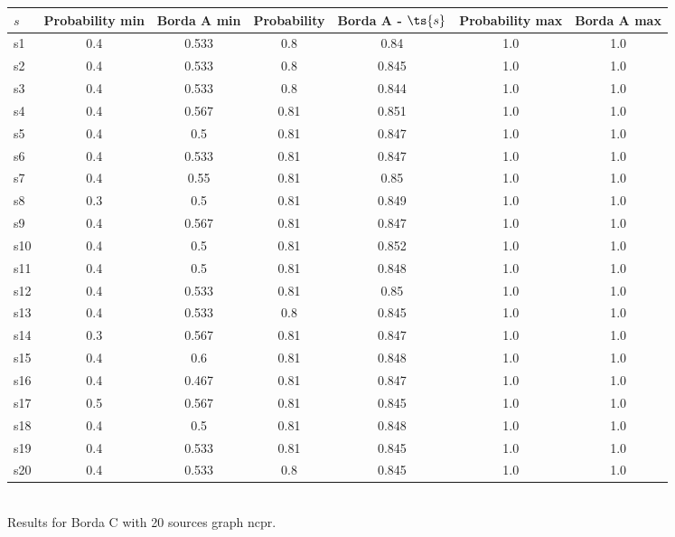 \documentclass{article}
\begin{document}
\noindent\begin{tabular}{|l|c|c|c|c|c|c|}
\hline
$s$& Probability min & Borda A min & Probability & Borda A - $\ts{s}$ & Probability max & Borda A max\\
\hline
s1 &0.4 & 0.533 & 0.8 & 0.84 & 1.0 & 1.0\\
\hline
s2 &0.4 & 0.533 & 0.8 & 0.845 & 1.0 & 1.0\\
\hline
s3 &0.4 & 0.533 & 0.8 & 0.844 & 1.0 & 1.0\\
\hline
s4 &0.4 & 0.567 & 0.81 & 0.851 & 1.0 & 1.0\\
\hline
s5 &0.4 & 0.5 & 0.81 & 0.847 & 1.0 & 1.0\\
\hline
s6 &0.4 & 0.533 & 0.81 & 0.847 & 1.0 & 1.0\\
\hline
s7 &0.4 & 0.55 & 0.81 & 0.85 & 1.0 & 1.0\\
\hline
s8 &0.3 & 0.5 & 0.81 & 0.849 & 1.0 & 1.0\\
\hline
s9 &0.4 & 0.567 & 0.81 & 0.847 & 1.0 & 1.0\\
\hline
s10 &0.4 & 0.5 & 0.81 & 0.852 & 1.0 & 1.0\\
\hline
s11 &0.4 & 0.5 & 0.81 & 0.848 & 1.0 & 1.0\\
\hline
s12 &0.4 & 0.533 & 0.81 & 0.85 & 1.0 & 1.0\\
\hline
s13 &0.4 & 0.533 & 0.8 & 0.845 & 1.0 & 1.0\\
\hline
s14 &0.3 & 0.567 & 0.81 & 0.847 & 1.0 & 1.0\\
\hline
s15 &0.4 & 0.6 & 0.81 & 0.848 & 1.0 & 1.0\\
\hline
s16 &0.4 & 0.467 & 0.81 & 0.847 & 1.0 & 1.0\\
\hline
s17 &0.5 & 0.567 & 0.81 & 0.845 & 1.0 & 1.0\\
\hline
s18 &0.4 & 0.5 & 0.81 & 0.848 & 1.0 & 1.0\\
\hline
s19 &0.4 & 0.533 & 0.81 & 0.845 & 1.0 & 1.0\\
\hline
s20 &0.4 & 0.533 & 0.8 & 0.845 & 1.0 & 1.0\\
\hline
\end{tabular}\\

\noindent Results for Borda C with 20 sources graph ncpr.
\end{document}
